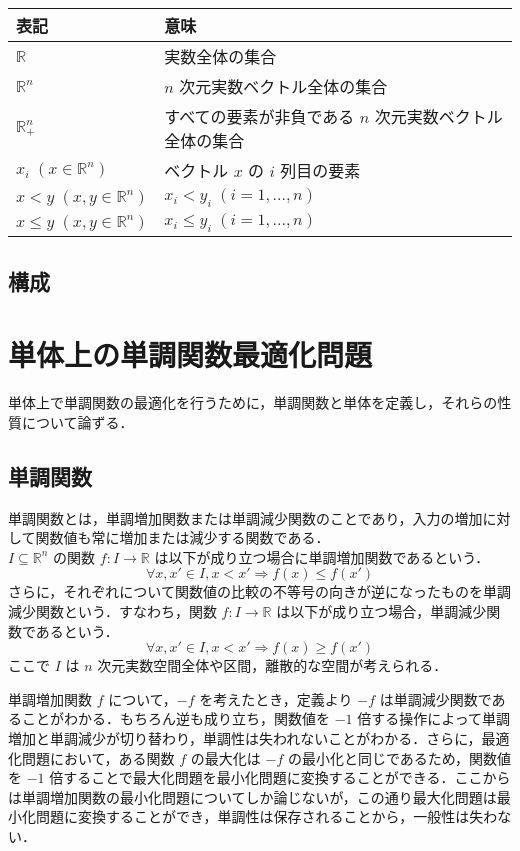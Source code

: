 \documentclass[a4paper,11pt]{jreport}
\begin{document}
\begin{table}[htb]
\begin{tabular}{ll}
表記 & 意味 \\ \hline
$ \mathbb{R} $ & 実数全体の集合 \\
$ \mathbb{R}^n $ & $ n $ 次元実数ベクトル全体の集合 \\
$ \mathbb{R}^n_{+} $ & すべての要素が非負である $ n $ 次元実数ベクトル全体の集合 \\
$ x_i \; (x \in \mathbb{R}^n) $ & ベクトル $ x $ の $ i $ 列目の要素 \\
$ x < y \; (x, y \in \mathbb{R}^n) $ & $ x_i < y_i \; (i = 1, ..., n) $ \\
$ x \leq y \; (x, y \in \mathbb{R}^n) $ & $ x_i \leq y_i \; (i = 1, ..., n) $
\end{tabular}
\end{table}


\section{構成}

\chapter{単体上の単調関数最適化問題}

単体上で単調関数の最適化を行うために，単調関数と単体を定義し，それらの性質について論ずる．

\section{単調関数}

単調関数とは，単調増加関数または単調減少関数のことであり，入力の増加に対して関数値も常に増加または減少する関数である．\\
$ I \subseteq \mathbb{R}^n $ の関数 $ f : I \to \mathbb{R} $ は以下が成り立つ場合に単調増加関数であるという．
$$ \forall x, x' \in I, x < x' \Rightarrow f(x) \leq f(x') $$
さらに，それぞれについて関数値の比較の不等号の向きが逆になったものを単調減少関数という．すなわち，関数 $ f : I \to \mathbb{R} $ は以下が成り立つ場合，単調減少関数であるという．
$$ \forall x, x' \in I, x < x' \Rightarrow f(x) \geq f(x') $$
ここで $ I $ は $ n $ 次元実数空間全体や区間，離散的な空間が考えられる．\par
単調増加関数 $ f $ について，$ -f $ を考えたとき，定義より $ -f $ は単調減少関数であることがわかる．もちろん逆も成り立ち，関数値を $ -1 $ 倍する操作によって単調増加と単調減少が切り替わり，単調性は失われないことがわかる．さらに，最適化問題において，ある関数 $ f $ の最大化は $ -f $ の最小化と同じであるため，関数値を $ -1 $ 倍することで最大化問題を最小化問題に変換することができる．ここからは単調増加関数の最小化問題についてしか論じないが，この通り最大化問題は最小化問題に変換することができ，単調性は保存されることから，一般性は失わない．
\end{document}
